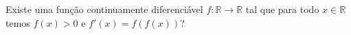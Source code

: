 Existe uma função continuamente diferenciável \(f \colon  \mathbb{R} \to \mathbb{R}\) tal que para todo \(x \in \mathbb{R}\) temos \(f(x) > 0\) e \(f'(x) = f(f(x))\)?
